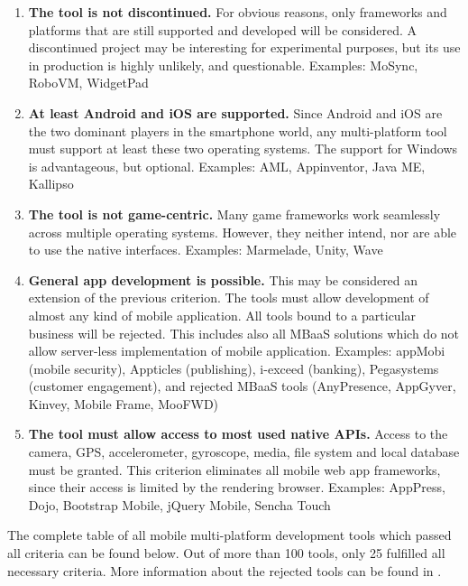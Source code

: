 \documentclass[english,master,public,dept460,male,cpdeclaration,oneside]{diploma}
\begin{document}
\begin{enumerate}
	\item \textbf{The tool is not discontinued.}
	For obvious reasons, only frameworks and platforms that are still supported and developed will be considered. A discontinued project may be interesting for experimental purposes, but its use in production is highly unlikely, and questionable.
	Examples: MoSync, RoboVM, WidgetPad
	\item \textbf{At least Android and iOS are supported.}
	Since Android and iOS are the two dominant players in the smartphone world, any multi-platform tool must support at least these two operating systems. The support for Windows is advantageous, but optional. 
	Examples: AML, Appinventor, Java ME, Kallipso
	\item \textbf{The tool is not game-centric.}
	Many game frameworks work seamlessly across multiple operating systems. However, they neither intend, nor are able to use the native interfaces.
	Examples: Marmelade, Unity, Wave
	\item \textbf{General app development is possible.}
	This may be considered an extension of the previous criterion. The tools must allow development of almost any kind of mobile application. All tools bound to a particular business will be rejected. This includes also all MBaaS solutions which do not allow server-less implementation of mobile application.
	Examples: appMobi (mobile security), Appticles (publishing), i-exceed (banking), Pegasystems (customer engagement), and rejected MBaaS tools (AnyPresence, AppGyver, Kinvey, Mobile Frame, MooFWD)
	\item \textbf{The tool must allow access to most used native APIs.}
	Access to the camera, GPS, accelerometer, gyroscope, media, file system and local database must be granted. This criterion eliminates all mobile web app frameworks, since their access is limited by the rendering browser.
	Examples: AppPress, Dojo, Bootstrap Mobile, jQuery Mobile, Sencha Touch
\end{enumerate}

The complete table of all mobile multi-platform development tools which passed all criteria can be found below. Out of more than 100 tools, only 25 fulfilled all necessary criteria. More information about the rejected tools can be found in \cite{aarhus}. 
\end{document}
